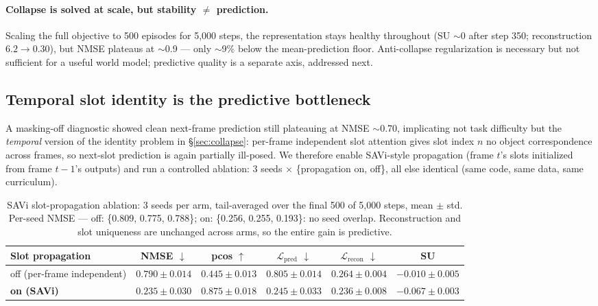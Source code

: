 \documentclass[12pt]{article}
\begin{document}
\paragraph{Collapse is solved at scale, but stability $\neq$ prediction.} Scaling the full objective to 500 episodes for 5{,}000 steps, the representation stays healthy throughout (SU $\sim$0 after step 350; reconstruction $6.2 \rightarrow 0.30$), but NMSE plateaus at $\sim$0.9 --- only $\sim$9\% below the mean-prediction floor. Anti-collapse regularization is necessary but not sufficient for a useful world model; predictive quality is a separate axis, addressed next.

\subsection{Temporal slot identity is the predictive bottleneck}
\label{sec:savi}

A masking-off diagnostic showed clean next-frame prediction still plateauing at NMSE $\sim$0.70, implicating not task difficulty but the \emph{temporal} version of the identity problem in \S\ref{sec:collapse}: per-frame independent slot attention gives slot index $n$ no object correspondence across frames, so next-slot prediction is again partially ill-posed. We therefore enable SAVi-style propagation (frame $t$'s slots initialized from frame $t{-}1$'s outputs) and run a controlled ablation: 3 seeds $\times$ \{propagation on, off\}, all else identical (same code, same data, same curriculum).

\begin{table}[t]
\centering
\caption{SAVi slot-propagation ablation: 3 seeds per arm, tail-averaged over the final 500 of 5{,}000 steps, mean $\pm$ std. Per-seed NMSE --- off: \{0.809, 0.775, 0.788\}; on: \{0.256, 0.255, 0.193\}: no seed overlap. Reconstruction and slot uniqueness are unchanged across arms, so the entire gain is predictive.}
\small
\begin{tabular}{@{}lccccc@{}}
\toprule
\textbf{Slot propagation} & \textbf{NMSE} $\downarrow$ & \textbf{pcos} $\uparrow$ & $\mathcal{L}_{\text{pred}}$ $\downarrow$ & $\mathcal{L}_{\text{recon}}$ $\downarrow$ & \textbf{SU} \\
\midrule
off (per-frame independent) & $0.790 \pm 0.014$ & $0.445 \pm 0.013$ & $0.805 \pm 0.014$ & $0.264 \pm 0.004$ & $-0.010 \pm 0.005$ \\
\textbf{on (SAVi)} & $\bm{0.235 \pm 0.030}$ & $\bm{0.875 \pm 0.018}$ & $\bm{0.245 \pm 0.033}$ & $0.236 \pm 0.008$ & $-0.067 \pm 0.003$ \\
\bottomrule
\end{tabular}
\label{tab:savi}
\end{table}
\end{document}
